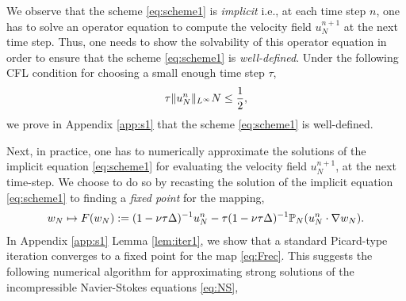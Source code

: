 \documentclass[reqno,a4paper]{amsart}
\begin{document}
We observe that the scheme \eqref{eq:scheme1} is \emph{implicit} i.e., at each time step $n$, one has to solve an operator equation to compute the velocity field $u^{n+1}_N$ at the next time step. Thus, one needs to show the solvability of this operator equation in order to ensure that the scheme \eqref{eq:scheme1} is \emph{well-defined}. Under the following CFL condition for choosing a small enough time step $\tau$, 
\begin{equation}
    \label{eq:cfl}
    {\tau} \Vert u^n_N \Vert_{L^\infty} N \le \frac12,
\end{equation}
we prove in Appendix \ref{app:s1} that the scheme \eqref{eq:scheme1} is well-defined. 

Next, in practice, one has to numerically approximate the solutions of the implicit equation \eqref{eq:scheme1} for evaluating the velocity field $u^{n+1}_N$, at the next time-step. We choose to do so by recasting the solution of the implicit equation \eqref{eq:scheme1} to finding a \emph{fixed point} for the mapping,
\begin{align} \label{eq:Frec}
w_N \mapsto F(w_N) := (1-\nu{\tau}\Delta)^{-1} u^n_N - {\tau} (1-\nu{\tau}\Delta)^{-1} \mathbb{P}_N(u^n_N\cdot \nabla w_N).
\end{align}
In Appendix \ref{app:s1} Lemma \ref{lem:iter1}, we show that a standard Picard-type iteration converges to a fixed point for the map \eqref{eq:Frec}. This suggests the following numerical algorithm for approximating strong solutions of the incompressible Navier-Stokes equations \eqref{eq:NS},
\end{document}
